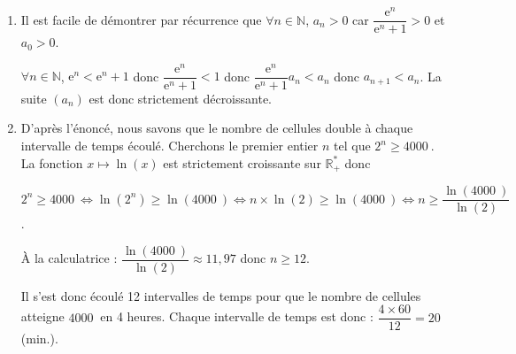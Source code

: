 \documentclass[10pt]{article}
\providecommand{\R}{\mathbb{R}}
\providecommand{\N}{\mathbb{N}}
\providecommand{\e}{{\mathrm{e}}}
\providecommand{\np}[2][]{{#2~#1}}
\begin{document}
\begin{enumerate}
Donc $\forall n \in \N$,  $w_n=\dfrac{w_{n+1}+4}{2}$.
	
$w_1=\dfrac{w_{2}+4}{2}=\dfrac{8+4}{2}=6$ et $w_0=\dfrac{w_{1}+4}{2}=\dfrac{6+4}{2}=5$ \hfill {}
	\item Il est facile de démontrer par récurrence que $\forall n \in \N$, $a_n > 0$ car $\dfrac{\e^n}{\e^n+1}> 0 $ et $a_0 > 0$.
	
$\forall n \in \N$, $\e^n <  \e^n+1$ donc $\dfrac{\e^n}{\e^n+1}< 1$ donc $\dfrac{\e^n}{\e^n+1} a_n< a_n$ donc $a_{n+1} < a_n$. La suite $(a_n)$ est donc strictement décroissante. \hfill {}
	
	\item D'après l'énoncé, nous savons que le nombre de cellules double à chaque intervalle de temps écoulé. Cherchons le premier entier $n$ tel que $2^n\geqslant \np{4000}$. La fonction $x\mapsto \ln(x)$ est strictement croissante sur $\R_+^*$ donc 
	
$2^n\geqslant \np{4000}\iff \ln\left(2^n\right) \geqslant \ln(\np{4000})\iff n \times \ln(2) \geqslant \ln(\np{4000}) \iff n \geqslant \dfrac{\ln(\np{4000}) }{\ln(2)}$.
	
À la calculatrice : $\dfrac{\ln(\np{4000}) }{\ln(2)}\approx 11,97$ donc $n\geqslant 12.$
	
Il s'est donc écoulé 12 intervalles de temps pour que le nombre de cellules atteigne $\np{4000}$ en 4 heures. Chaque intervalle de temps est donc : $\dfrac{4\times 60}{12}= 20$ (min.).\hfill {}
	
\end{enumerate}

\bigskip
\end{document}
